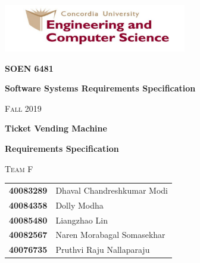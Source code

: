 \documentclass[15pt]{article}
\begin{document}
\begin{titlepage}

\addtolength{\hoffset}{-0.1cm}
	\centering
	\includegraphics[width=0.60\textwidth]{logo.png}\par\vspace{1.5cm}
	{\huge\bfseries SOEN 6481 \par}
	{\huge\bfseries Software Systems Requirements Specification \par}
	{\scshape\LARGE Fall 2019 \par}
	\vspace{1cm}
	\vspace{1.5cm}
	{\huge\bfseries Ticket Vending Machine \par}
	{\huge\bfseries Requirements Specification \par}
	\vspace{1cm}
	{\scshape\LARGE Team F \par}

	\vspace{0.5cm}
	\begin{tabular}{ c l }
	\vspace{0.2cm}
	{\Large\bfseries 40083289 \par} & {\Large Dhaval Chandreshkumar Modi \par}\\
	\vspace{0.2cm}
	{\Large\bfseries 40084358 \par} & {\Large Dolly Modha  \par}\\
	\vspace{0.2cm}
	{\Large\bfseries 40085480 \par} & {\Large Liangzhao Lin  \par}\\
	\vspace{0.2cm}
	{\Large\bfseries 40082567 \par} & {\Large Naren Morabagal Somasekhar \par}\\
	\vspace{0.2cm}
	{\Large\bfseries 40076735 \par} & {\Large Pruthvi Raju Nallaparaju \par}\\
	\end{tabular}
	\vspace{0.5cm}


\end{titlepage}
\end{document}

